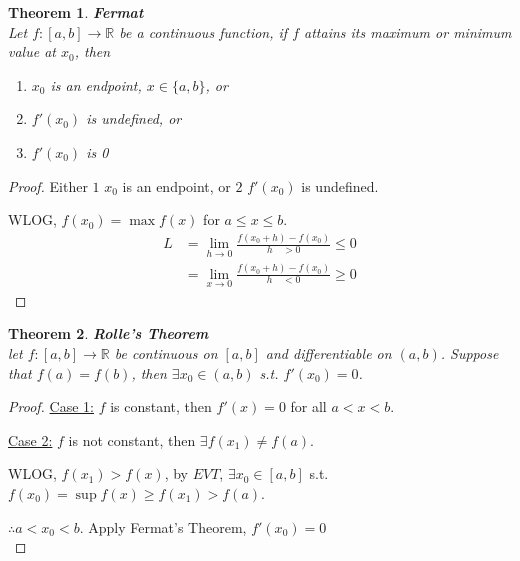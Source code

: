 \documentclass[12pt]{article}
\theoremstyle{plain}
\newtheorem{theorem}{Theorem}[subsection]
\newcommand{\dlim}{\displaystyle\lim\limits}
\begin{document}
    \begin{theorem}{\textbf{ Fermat}}\\
        Let $f:[a,b] \to \mathbb{R}$ be a continuous function, 
        if $f$ attains its maximum or minimum value at $x_0$,
        then 
        \begin{enumerate}
            \item $x_0$ is an endpoint, $x\in\{a, b\}$, \qquad or 
            \item $f'(x_0)$ is undefined,  \qquad \qquad  \quad or 
            \item $f'(x_0)$ is 0
        \end{enumerate}
    \end{theorem}
    \begin{proof}
        Either $1$ $x_0$ is an endpoint, or $2$ $f'(x_0)$ is undefined.
        
        WLOG, $f(x_0) =\max{f(x)}$ for $a \leq x\leq b$.
        \begin{align*}
        	L &= \dlim_{h\to 0} \frac{f(x_0+h)-f(x_0)}{h\quad >0 }
        	\leq 0 \\
        		&= \dlim_{x\to 0} \frac{f(x_0+h)-f(x_0)}{h\quad <0}
        		\geq 0
        \end{align*}
    \end{proof}


    \begin{theorem}{\textbf{Rolle's Theorem}}\\
        let $f:[a,b]\to\mathbb{R}$ be continuous on $[a,b]$ and differentiable
        on $(a, b)$. 
        Suppose that $f(a) = f(b)$, then $\exists x_0\in(a,b)$ s.t. $f'(x_0)=0$. 
    \end{theorem}
    \begin{proof}
        \underline {Case 1:} $f$ is constant, then $f'(x) = 0$ for all $a<x<b$.

        \underline {Case 2:} $f$ is not constant, then $\exists f(x_1) \neq f(a)$. 
                
        WLOG, $f(x_1)>f(x)$, by $EVT$, $\exists x_0\in[a,b]$ s.t. 
        $f(x_0) = \sup f(x)\geq f(x_1)>f(a)$.  

        $\therefore a<x_0<b$. Apply Fermat's Theorem, $f'(x_0) = 0$\\
    \end{proof}

\end{document}
